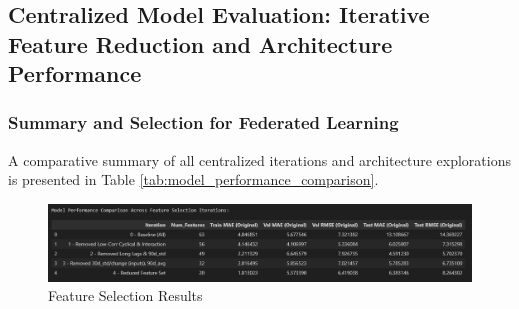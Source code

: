 \subsection{Centralized Model Evaluation: Iterative Feature Reduction and Architecture Performance}
\label{ssec:centralized_performance}


\subsubsection*{Summary and Selection for Federated Learning}
\label{sssec:centralized_summary_selection}
A comparative summary of all centralized iterations and architecture explorations is presented in Table \ref{tab:model_performance_comparison}.

\begin{figure}[H]
    \centering
    \includegraphics[width=0.75\linewidth]{Figures/feature_selection.png}
    \caption{Feature Selection Results}
    \label{fig:enter-label}
\end{figure}

